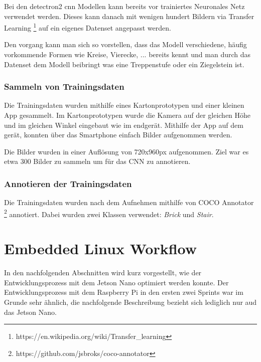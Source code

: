 Bei den detectron2 \acrshort{cnn} Modellen kann bereits vor trainiertes Neuronales Netz
verwendet werden. Dieses kann danach mit wenigen hundert Bildern via Transfer Learning \footnote{https://en.wikipedia.org/wiki/Transfer\_learning}
auf ein eigenes Datenset angepasst werden.

Den vorgang kann man sich so vorstellen, dass das Modell verschiedene, häufig vorkommende Formen wie Kreise, Vierecke, ...
bereits kennt und man durch das Datenset dem Modell beibringt was eine Treppenstufe oder ein Ziegelstein ist.

\subsubsection{Sammeln von Trainingsdaten}

Die Trainingsdaten wurden mithilfe eines Kartonprototypen und einer kleinen App gesammelt.
Im Kartonprototypen wurde die Kamera auf der gleichen Höhe und im gleichen Winkel eingebaut
wie im endgerät.
Mithilfe der App auf dem gerät, konnten über das Smartphone einfach Bilder aufgenommen werden.

Die Bilder wurden in einer Auflösung von 720x960px aufgenommen. Ziel war es etwa 300 Bilder zu sammeln um für das \acrshort{CNN} zu annotieren.


\subsubsection{Annotieren der Trainingsdaten}

Die Trainingsdaten wurden nach dem Aufnehmen mithilfe von COCO Annotator \footnote{https://github.com/jsbroks/coco-annotator} annotiert.
Dabei wurden zwei Klassen verwendet: {\it Brick} und {\it Stair}.




\section{Embedded Linux Workflow}
In den nachfolgenden Abschnitten wird kurz vorgestellt, wie der Entwicklungsprozess mit dem Jetson Nano optimiert werden konnte. Der Entwicklungsprozess mit dem Raspberry Pi in den ersten zwei Sprints war im Grunde sehr ähnlich, die nachfolgende Beschreibung bezieht sich lediglich nur aud das Jetson Nano.

